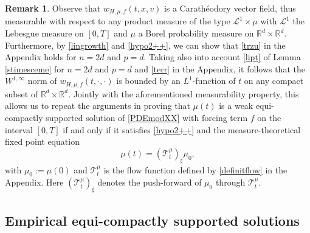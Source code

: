 \documentclass[11pt]{article}
\theoremstyle{plain}
\theoremstyle{definition}
\newtheorem{remark}[theorem]{Remark}
\theoremstyle{remark}
\numberwithin{equation}{section}
\newcommand{\Lone}{{\mathcal L}^{1}}
\newcommand{\R}{{\mathbb R}}
\begin{document}
\begin{remark}
Observe that $w_{H, \mu, f}(t,x,v)$ is a Carath{\'e}odory vector field, thus measurable with respect to any product measure of the type $\Lone \times \mu$ with $\Lone$ the Lebesgue measure on $[0, T]$ and $\mu$ a Borel probability measure on $\R^d\times \R^d$. Furthermore, by \eqref{lingrowth} and \eqref{hypo2++}, we can show that \eqref{trzu} in the Appendix holds for $n=2d$ and $p=d$. Taking also into account \eqref{lipt}  of Lemma \ref{stimesceme} for $n=2d$ and $p=d$ and \eqref{terr} in the Appendix, it follows that the $W^{1, \infty}$ norm of $w_{H, \mu, f}(t,\cdot,\cdot)$ is bounded by an $L^1$-function of $t$ on any compact subset of $\R^d \times \R^d$. Jointly with the aforementioned measurability property, this allows us to repeat the arguments in \cite[Section 8.1]{AGS} proving that $\mu(t)$ is a weak equi-compactly supported solution of \eqref{PDEmodXX} with forcing term $f$ on the interval $[0, T]$ if and only if it satisfies \eqref{hypo2++} and the measure-theoretical fixed point equation
\begin{equation}\label{pushf}
\mu(t)=({\mathcal T}^\mu_t)_\sharp\mu_0,
\end{equation}
with $\mu_0:=\mu(0)$ and ${\mathcal T}^\mu_t$ is the flow function defined by \eqref{definitflow} in the Appendix. Here $({\mathcal T}^\mu_t)_\sharp$ denotes the push-forward of $\mu_0$ through ${\mathcal T}^\mu_t$.
\end{remark}


\subsection{Empirical equi-compactly supported solutions}
\end{document}
